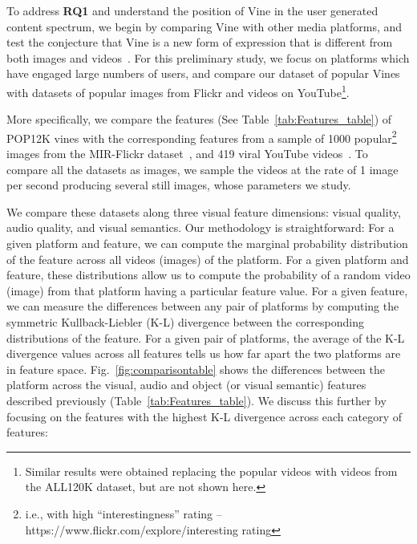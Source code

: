 
To address \textbf{RQ1} and understand the position of Vine in the user generated content spectrum, %
we begin by comparing Vine with other media platforms, %
and test the conjecture that Vine is a new form of expression that is different from both images and videos~\cite{pogue13}. For this preliminary study, we focus on platforms which have engaged large numbers of users, and compare our dataset of popular Vines with datasets of popular images from Flickr and videos on YouTube\footnote{Similar results were obtained replacing the popular videos with videos from the ALL120K dataset, but are not shown here.}.   

More specifically, we compare the features (See Table~\ref{tab:Features_table}) of POP12K vines with the corresponding features from a sample of 1000 popular\footnote{i.e., with high  ``interestingness'' rating -- \scriptsize https://www.flickr.com/explore/interesting rating}  images from the MIR-Flickr dataset~\cite{huiskes08}, and 419 viral YouTube videos~\cite{Jiang:2014:VVS:2578726.2578754}. To compare all the datasets as images, we sample the videos at the rate of 1 image per second producing several still images, whose parameters we study. 

We compare these datasets along three visual feature dimensions: visual quality, audio quality, and visual semantics.
Our methodology is straightforward: For a given platform and feature, we can compute the  marginal probability distribution of the feature across all videos (images) of the platform. For a given platform and feature, these distributions allow us to compute the probability of a random video (image) from that platform having a particular feature value. For a given feature, we can measure the differences between any pair of platforms by computing the symmetric Kullback-Liebler (K-L) divergence between the corresponding distributions of the feature. For a given pair of platforms, the average of the K-L divergence values across all features tells us how far apart the two platforms are in feature space. Fig.~\ref{fig:comparisontable} shows the differences between the platform across the visual, audio and object (or visual semantic) features described previously (Table~\ref{tab:Features_table}). We discuss this further by focusing on the features with the highest K-L divergence across each category of features: 

